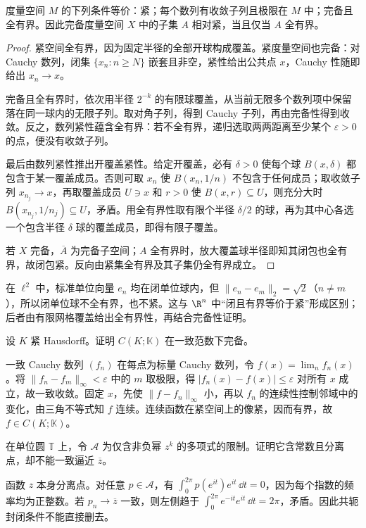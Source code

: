 \begin{theorem}[度量紧性的等价条件]\label{thm:y0-metric-compact}
度量空间 $M$ 的下列条件等价：紧；每个数列有收敛子列且极限在 $M$ 中；完备且全有界。因此完备度量空间 $X$ 中的子集 $A$ 相对紧，当且仅当 $A$ 全有界。
\end{theorem}
\begin{proof}
紧空间全有界，因为固定半径的全部开球构成覆盖。紧度量空间也完备：对 Cauchy 数列，闭集 $\overline{\{x_n:n\ge N\}}$ 嵌套且非空，紧性给出公共点 $x$，Cauchy 性随即给出 $x_n\to x$。

完备且全有界时，依次用半径 $2^{-k}$ 的有限球覆盖，从当前无限多个数列项中保留落在同一球内的无限子列。取对角子列，得到 Cauchy 子列，再由完备性得到收敛。反之，数列紧性蕴含全有界：若不全有界，递归选取两两距离至少某个 $\varepsilon>0$ 的点，便没有收敛子列。

最后由数列紧性推出开覆盖紧性。给定开覆盖，必有 $\delta>0$ 使每个球 $B(x,\delta)$ 都包含于某一覆盖成员。否则可取 $x_n$ 使 $B(x_n,1/n)$ 不包含于任何成员；取收敛子列 $x_{n_j}\to x$，再取覆盖成员 $U\ni x$ 和 $r>0$ 使 $B(x,r)\subseteq U$，则充分大时 $B(x_{n_j},1/n_j)\subseteq U$，矛盾。用全有界性取有限个半径 $\delta/2$ 的球，再为其中心各选一个包含半径 $\delta$ 球的覆盖成员，即得有限子覆盖。

若 $X$ 完备，$\overline A$ 为完备子空间；$A$ 全有界时，放大覆盖球半径即知其闭包也全有界，故闭包紧。反向由紧集全有界及其子集仍全有界成立。
\end{proof}

\begin{example}[有界不足以推出紧]
在 $\ell^2$ 中，标准单位向量 $e_n$ 均在闭单位球内，但 $\|e_n-e_m\|_2=\sqrt2$（$n\ne m$），所以闭单位球不全有界，也不紧。这与 $\R^n$ 中“闭且有界等价于紧”形成区别；后者由有限网格覆盖给出全有界性，再结合完备性证明。
\end{example}

\begin{exercise}[紧空间上的连续函数空间]
设 $K$ 紧 Hausdorff。证明 $C(K;\mathbb K)$ 在一致范数下完备。
\end{exercise}
\begin{solution}
一致 Cauchy 数列 $(f_n)$ 在每点为标量 Cauchy 数列，令 $f(x)=\lim_nf_n(x)$。将 $\|f_n-f_m\|_\infty<\varepsilon$ 中的 $m$ 取极限，得 $|f_n(x)-f(x)|\le\varepsilon$ 对所有 $x$ 成立，故一致收敛。固定 $x$，先使 $\|f-f_n\|_\infty$ 小，再以 $f_n$ 的连续性控制邻域中的变化，由三角不等式知 $f$ 连续。连续函数在紧空间上的像紧，因而有界，故 $f\in C(K;\mathbb K)$。
\end{solution}

\begin{exercise}
在单位圆 $\mathbb T$ 上，令 $\mathcal A$ 为仅含非负幂 $z^k$ 的多项式的限制。证明它含常数且分离点，却不能一致逼近 $\overline z$。
\end{exercise}
\begin{solution}
函数 $z$ 本身分离点。对任意 $p\in\mathcal A$，有 $\int_0^{2\pi}p(e^{it})e^{it}\,\dd t=0$，因为每个指数的频率均为正整数。若 $p_n\to\overline z$ 一致，则左侧趋于 $\int_0^{2\pi}e^{-it}e^{it}\,\dd t=2\pi$，矛盾。因此共轭封闭条件不能直接删去。
\end{solution}
